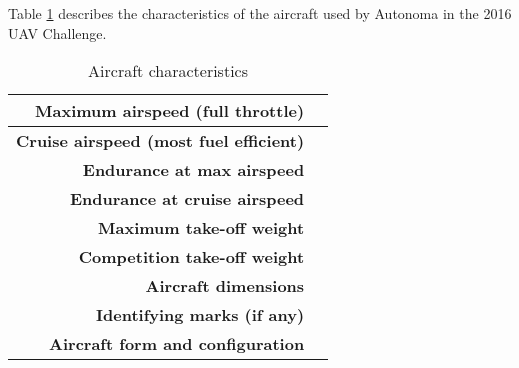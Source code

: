 Table \ref{tab:aircraft} describes the characteristics of the aircraft used by Autonoma in the 2016 UAV Challenge.

\begin{table}[H]
	\centering
	\begin{tabular}{|r|l|}
		\hline
		\textbf{Maximum airspeed (full throttle)}      &  \\ \hline
		\textbf{Cruise airspeed (most fuel efficient)} &  \\ \hline
		\textbf{Endurance at max airspeed}             &  \\ \hline
		\textbf{Endurance at cruise airspeed}          &  \\ \hline
		\textbf{Maximum take-off weight}               &  \\ \hline
		\textbf{Competition take-off weight}           &  \\ \hline
		\textbf{Aircraft dimensions}                   &  \\ \hline
		\textbf{Identifying marks (if any)}            &  \\ \hline
		\textbf{Aircraft form and configuration}       &  \\ \hline
	\end{tabular}
	\caption{Aircraft characteristics}
	\label{tab:aircraft}
\end{table}
